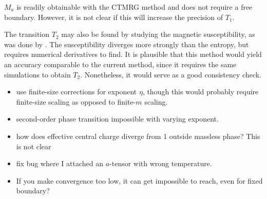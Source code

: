 $M_a$ is readily obtainable with the CTMRG method and does not require a free boundary.
However, it is not clear if this will increase the precision of $T_1$.

The transition $T_2$ may also be found by studying the magnetic susceptibility,
as was done by \cite{borisenko2011numerical}.
The susceptibility diverges more strongly than the entropy, but requires numerical derivatives to find.
It is plausible that this method would yield an accuracy comparable to the current method,
since it requires the same simulations to obtain $T_2$. Nonetheless, it would serve as a good consistency check.

\begin{itemize}
  \item use finite-size corrections for exponent $\eta$, though this would probably require finite-size scaling
  as opposed to finite-$m$ scaling.
  \item second-order phase transition impossible with varying exponent.
  \item how does effective central charge diverge from 1 outside massless phase? This is not clear
\end{itemize}


\begin{itemize}
  \item fix bug where I attached an $a$-tensor with wrong temperature.
  \item If you make convergence too low, it can get impossible to reach, even for fixed boundary?
\end{itemize}
